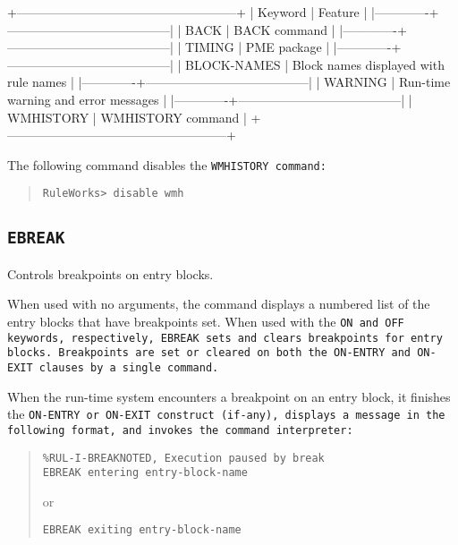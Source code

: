 +-----------------------------------------------------+
| Keyword     | Feature                               |
|-------------+---------------------------------------|
| BACK        | BACK command                          |
|-------------+---------------------------------------|
| TIMING      | PME package                           |
|-------------+---------------------------------------|
| BLOCK-NAMES | Block names displayed with rule names |
|-------------+---------------------------------------|
| WARNING     | Run-time warning and error messages   |
|-------------+---------------------------------------|
| WMHISTORY   | WMHISTORY command                     |
+-----------------------------------------------------+

\Example

The following command disables the \tt{WMHISTORY} command:

\begin{quote}
\begin{verbatim}
RuleWorks> disable wmh
\end{verbatim}
\end{quote}


\subsection{\tt{EBREAK}}

Controls breakpoints on entry blocks.

When used with no arguments, the command displays a numbered list of
the entry blocks that have breakpoints set. When used with the \tt{ON}
and \tt{OFF} keywords, respectively, \tt{EBREAK} sets and clears
breakpoints for entry blocks. Breakpoints are set or cleared on both
the \tt{ON-ENTRY} and \tt{ON-EXIT} clauses by a single command.

When the run-time system encounters a breakpoint on an entry block, it
finishes the \tt{ON-ENTRY} or \tt{ON-EXIT} construct (if-any),
displays a message in the following format, and invokes the command
interpreter:

\begin{quote}
\begin{verbatim}
%RUL-I-BREAKNOTED, Execution paused by break
EBREAK entering entry-block-name
\end{verbatim}
or
\begin{verbatim}
EBREAK exiting entry-block-name
\end{verbatim}
\end{quote}

